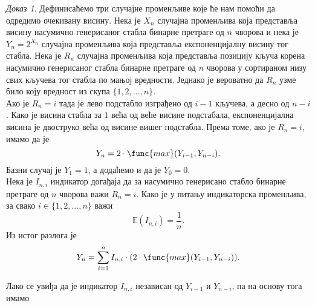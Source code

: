 \documentclass[11pt, a4paper]{article}
\theoremstyle{remark}
\newtheorem*{dokaz}{\selectlanguage{russian} Доказ}
\numberwithin{equation}{section}
\begin{document}
	\begin{dokaz}
		Дефинисаћемо три случајне променљиве које ће нам помоћи да одредимо очекивану висину. Нека је $X_n$ случајна променљива која представља висину насумично генерисаног стабла  бинарне претраге од $n$ чворова и нека је $Y_n=2^{X_n}$ случајна променљива која представља експоненцијалну висину тог стабла. Нека је $R_n$ случајна променљива која представља позицију кључа корена насумично генерисаног стабла бинарне претраге од $n$ чворова у сортираном низу свих кључева тог стабла по мањој вредности. Једнако је вероватно да $R_n$ узме било коју вредност из скупа $\{1, 2, ..., n\}$. \\
		\indent Ако је $R_n=i$ тада је лево подстабло изграђено од $i-1$ кључева, а десно од $n-i$. Како је висина стабла за $1$ већа од веће висине подстабала, експоненцијална висина је двоструко већа од висине вишег подстабла. Према томе, ако је $R_n=i$, имамо да је
		\begin{equation}
			Y_n=2\cdot \func{max}(Y_{i-1}, Y_{n-i}).
		\end{equation}
		Базни случај је $Y_1=1$, а додаћемо и да је $Y_0=0$. \\
		
		\noindent Нека је $I_{n, i}$ индикатор догађаја да за насумично генерисано стабло бинарне претраге од $n$ чворова важи $R_n=i$. Како је у питању индикаторска променљива, за свако $i \in \{1, 2, ..., n \}$ важи
		\begin{equation}
			\mathbb{E}(I_{n, i})=\frac{1}{n}.
		\end{equation}
		Из истог разлога је
		\begin{equation}
			Y_n=\sum_{i=1}^{n} I_{n, i} \cdot (2\cdot \func{max}(Y_{i-1}, Y_{n-i})).
		\end{equation}
		
		\newpage
		
		\noindent Лако се увиђа да је индикатор $I_{n, i}$ независан од $Y_{i-1}$ и $Y_{n-i}$, па на основу тога имамо
		

\end{dokaz}
\end{document}
